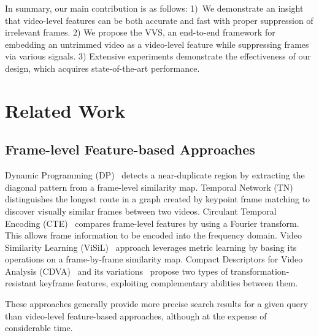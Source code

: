 \documentclass[10pt,twocolumn,letterpaper]{article}
\begin{document}
    In summary, our main contribution is as follows: 1)~We demonstrate an insight that video-level features can be both accurate and fast with proper suppression of irrelevant frames. 2) We propose the VVS, an end-to-end framework for embedding an untrimmed video as a video-level feature while suppressing frames via various signals. 3) Extensive experiments demonstrate the effectiveness of our design, which acquires state-of-the-art performance.

\section{Related Work} 
        
    \subsection{Frame-level Feature-based Approaches}
        Dynamic Programming (DP)~\cite{chou2015pattern} detects a near-duplicate region by extracting the diagonal pattern from a frame-level similarity map. Temporal Network (TN)~\cite{tan2009scalable} distinguishes the longest route in a graph created by keypoint frame matching to discover visually similar frames between two videos. Circulant Temporal Encoding (CTE)~\cite{douze2016circulant} compares frame-level features by using a Fourier transform. This allows frame information to be encoded into the frequency domain. Video Similarity Learning (ViSiL)~\cite{kordopatis2019visil} approach leverages metric learning by basing its operations on a frame-by-frame similarity map. Compact Descriptors for Video Analysis (CDVA)~\cite{cfp_cdva} and its variations~\cite{lou2017compact, lin2017hnip, duan2018compact, jo2022exploring} propose two types of transformation-resistant keyframe features, exploiting complementary abilities between them. 
        
        These approaches generally provide more precise search results for a given query than video-level feature-based approaches, although at the expense of considerable time.
        
\end{document}
